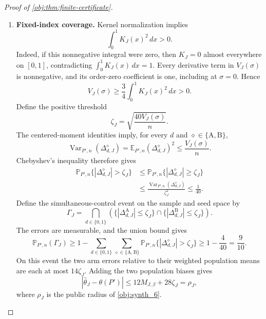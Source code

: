 \begin{proof}[Proof of \cref{obj:thm:finite-certificate}]
\begin{enumerate}
The triangle inequality for the two arm estimates and their population biases now gives
\[
\begin{aligned}
|\widehat\theta_J-\theta(P')|
\le{}&12M_{J,\beta}\\
&+8\bigl(|\Delta^{\mathrm A}_{1,J}|
+|\Delta^{\mathrm A}_{0,J}|\bigr)
+6\bigl(|\Delta^{\mathrm B}_{1,J}|
+|\Delta^{\mathrm B}_{0,J}|\bigr).
\end{aligned}
\]
For each of the four errors, Cauchy--Schwarz on the probability experiment gives
\[
\mathbb E_{P',n}|\Delta^\diamond_{d,J}|
\le\sqrt{\mathbb E_{P',n}(\Delta^\diamond_{d,J})^2}
\le\sqrt{\frac{V_J(\sigma)}n}.
\]
The displayed upper bound on the effect error is integrable, so integration yields
\[
\mathbb E_{P',n}|\widehat\theta_J-\theta(P')|
\le12M_{J,\beta}
+28\sqrt{\frac{V_J(\sigma)}n}.
\]

\item \textbf{Fixed-index coverage.}
Kernel normalization implies
\[
\int_0^1K_J(x)^2\,dx>0.
\]
Indeed, if this nonnegative integral were zero, then \(K_J=0\) almost everywhere on \([0,1]\), contradicting
\(\int_0^1K_J(x)\,dx=1\). Every derivative term in \(V_J(\sigma)\) is nonnegative, and its order-zero coefficient is one, including at \(\sigma=0\). Hence
\[
V_J(\sigma)\ge\frac34\int_0^1K_J(x)^2\,dx>0.
\]
Define the positive threshold
\[
\zeta_J=\sqrt{\frac{40V_J(\sigma)}n}.
\]
The centered-moment identities imply, for every \(d\) and
\(\diamond\in\{\mathrm A,\mathrm B\}\),
\[
\operatorname{Var}_{P',n}(\Delta^\diamond_{d,J})
=\mathbb E_{P',n}(\Delta^\diamond_{d,J})^2
\le\frac{V_J(\sigma)}n.
\]
Chebyshev's inequality therefore gives
\[
\begin{aligned}
\mathbb P_{P',n}\{|\Delta^\diamond_{d,J}|>\zeta_J\}
&\le\mathbb P_{P',n}\{|\Delta^\diamond_{d,J}|\ge\zeta_J\}\\
&\le\frac{\operatorname{Var}_{P',n}(\Delta^\diamond_{d,J})}
{\zeta_J^2}
\le\frac1{40}.
\end{aligned}
\]
Define the simultaneous-control event on the sample and seed space by
\[
\Gamma_J
=\bigcap_{d\in\{0,1\}}
\left(
\{|\Delta^{\mathrm A}_{d,J}|\le\zeta_J\}
\cap
\{|\Delta^{\mathrm B}_{d,J}|\le\zeta_J\}
\right).
\]
The errors are measurable, and the union bound gives
\[
\mathbb P_{P',n}(\Gamma_J)
\ge1-\sum_{d\in\{0,1\}}
\sum_{\diamond\in\{\mathrm A,\mathrm B\}}
\mathbb P_{P',n}\{|\Delta^\diamond_{d,J}|>\zeta_J\}
\ge1-\frac4{40}=\frac9{10}.
\]
On this event the two arm errors relative to their weighted population means are each at most \(14\zeta_J\). Adding the two population biases gives
\[
|\widehat\theta_J-\theta(P')|
\le12M_{J,\beta}+28\zeta_J
=\rho_J,
\]
where \(\rho_J\) is the public radius of \cref{obj:synth_6}.


\end{enumerate}
\end{proof}
